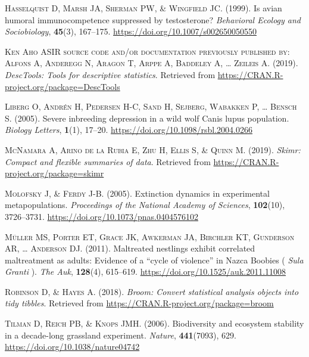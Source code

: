\documentclass[a4paperpaper,]{article}
\begin{document}
\leavevmode\hypertarget{ref-Hasselquist1999}{}%
\textsc{Hasselquist D, Marsh JA, Sherman PW, \& Wingfield JC}. (1999). Is avian humoral immunocompetence suppressed by testosterone? \emph{Behavioral Ecology and Sociobiology}, \textbf{45}(3), 167--175. \url{https://doi.org/10.1007/s002650050550}

\leavevmode\hypertarget{ref-R-DescTools}{}%
\textsc{Ken Aho ASIR source code and/or documentation previously published by: Alfons A, Anderegg N, Aragon T, Arppe A, Baddeley A, \ldots{} Zeileis A}. (2019). \emph{DescTools: Tools for descriptive statistics}. Retrieved from \url{https://CRAN.R-project.org/package=DescTools}

\leavevmode\hypertarget{ref-liberg2005}{}%
\textsc{Liberg O, Andrén H, Pedersen H-C, Sand H, Sejberg, Wabakken P, \ldots{} Bensch S}. (2005). Severe inbreeding depression in a wild wolf Canis lupus population. \emph{Biology Letters}, \textbf{1}(1), 17--20. \url{https://doi.org/10.1098/rsbl.2004.0266}

\leavevmode\hypertarget{ref-R-skimr}{}%
\textsc{McNamara A, Arino de la Rubia E, Zhu H, Ellis S, \& Quinn M}. (2019). \emph{Skimr: Compact and flexible summaries of data}. Retrieved from \url{https://CRAN.R-project.org/package=skimr}

\leavevmode\hypertarget{ref-Molofsky2005}{}%
\textsc{Molofsky J, \& Ferdy J-B}. (2005). Extinction dynamics in experimental metapopulations. \emph{Proceedings of the National Academy of Sciences}, \textbf{102}(10), 3726--3731. \url{https://doi.org/10.1073/pnas.0404576102}

\leavevmode\hypertarget{ref-muller2011}{}%
\textsc{Müller MS, Porter ET, Grace JK, Awkerman JA, Birchler KT, Gunderson AR, \ldots{} Anderson DJ}. (2011). Maltreated nestlings exhibit correlated maltreatment as adults: Evidence of a ``cycle of violence'' in Nazca Boobies ( \emph{Sula} \emph{Granti} ). \emph{The Auk}, \textbf{128}(4), 615--619. \url{https://doi.org/10.1525/auk.2011.11008}

\leavevmode\hypertarget{ref-R-broom}{}%
\textsc{Robinson D, \& Hayes A}. (2018). \emph{Broom: Convert statistical analysis objects into tidy tibbles}. Retrieved from \url{https://CRAN.R-project.org/package=broom}

\leavevmode\hypertarget{ref-tilman2006}{}%
\textsc{Tilman D, Reich PB, \& Knops JMH}. (2006). Biodiversity and ecosystem stability in a decade-long grassland experiment. \emph{Nature}, \textbf{441}(7093), 629. \url{https://doi.org/10.1038/nature04742}
\end{document}

